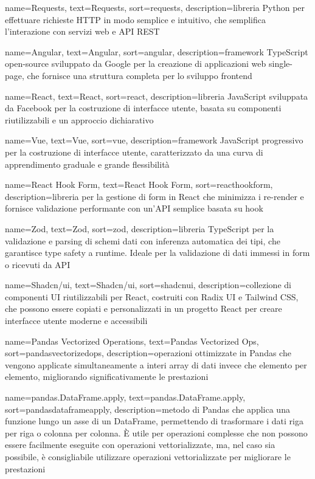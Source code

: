  {
    name=Requests,
    text=Requests,
    sort=requests,
    description={libreria Python per effettuare richieste HTTP in modo semplice e intuitivo, che semplifica l'interazione con servizi web e API REST}
}

 {
    name=Angular,
    text=Angular,
    sort=angular,
    description={framework TypeScript open-source sviluppato da Google per la creazione di applicazioni web single-page, che fornisce una struttura completa per lo sviluppo frontend}
}

 {
    name=React,
    text=React,
    sort=react,
    description={libreria JavaScript sviluppata da Facebook per la costruzione di interfacce utente, basata su componenti riutilizzabili e un approccio dichiarativo}
}

 {
    name=Vue,
    text=Vue,
    sort=vue,
    description={framework JavaScript progressivo per la costruzione di interfacce utente, caratterizzato da una curva di apprendimento graduale e grande flessibilità}
}

 {
    name=React Hook Form,
    text=React Hook Form,
    sort=reacthookform,
    description={libreria per la gestione di form in React che minimizza i re-render e fornisce validazione performante con un'API semplice basata su hook}
}

 {
    name=Zod,
    text=Zod,
    sort=zod,
    description={libreria TypeScript per la validazione e parsing di schemi dati con inferenza automatica dei tipi, che garantisce type safety a runtime. Ideale per la validazione di dati immessi in form o ricevuti da API}
}

 {
    name=Shadcn/ui,
    text=Shadcn/ui,
    sort=shadcnui,
    description={collezione di componenti UI riutilizzabili per React, costruiti con Radix UI e Tailwind CSS, che possono essere copiati e personalizzati in un progetto React per creare interfacce utente moderne e accessibili}
}

 {
    name=Pandas Vectorized Operations,
    text=Pandas Vectorized Ops,
    sort=pandasvectorizedops,
    description={operazioni ottimizzate in Pandas che vengono applicate simultaneamente a interi array di dati invece che elemento per elemento, migliorando significativamente le prestazioni}
}

 {
    name=pandas.DataFrame.apply,
    text=pandas.DataFrame.apply,
    sort=pandasdataframeapply,
    description={metodo di Pandas che applica una funzione lungo un asse di un DataFrame, permettendo di trasformare i dati riga per riga o colonna per colonna. È utile per operazioni complesse che non possono essere facilmente eseguite con operazioni vettorializzate, ma, nel caso sia possibile, è consigliabile utilizzare operazioni vettorializzate per migliorare le prestazioni}
}

